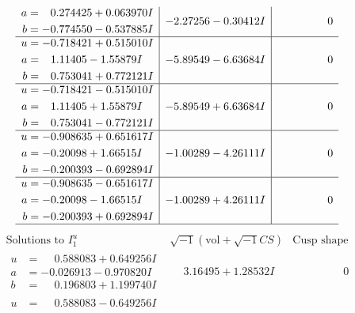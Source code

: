 \documentclass[1p]{elsarticle_modified}
\theoremstyle{definition}
\newcommand{\I}{\sqrt{-1}}
\begin{document}
$$\begin{array}{c|c|c}
\begin{aligned}
a &= \phantom{-}0.274425 + 0.063970 I \\
b &= -0.774550 - 0.537885 I\end{aligned}
 & -2.27256 - 0.30412 I & \phantom{-0.000000 } 0 \\ \hline\begin{aligned}
u &= -0.718421 + 0.515010 I \\
a &= \phantom{-}1.11405 - 1.55879 I \\
b &= \phantom{-}0.753041 + 0.772121 I\end{aligned}
 & -5.89549 - 6.63684 I & \phantom{-0.000000 } 0 \\ \hline\begin{aligned}
u &= -0.718421 - 0.515010 I \\
a &= \phantom{-}1.11405 + 1.55879 I \\
b &= \phantom{-}0.753041 - 0.772121 I\end{aligned}
 & -5.89549 + 6.63684 I & \phantom{-0.000000 } 0 \\ \hline\begin{aligned}
u &= -0.908635 + 0.651617 I \\
a &= -0.20098 + 1.66515 I \\
b &= -0.200393 - 0.692894 I\end{aligned}
 & -1.00289 - 4.26111 I & \phantom{-0.000000 } 0 \\ \hline\begin{aligned}
u &= -0.908635 - 0.651617 I \\
a &= -0.20098 - 1.66515 I \\
b &= -0.200393 + 0.692894 I\end{aligned}
 & -1.00289 + 4.26111 I & \phantom{-0.000000 } 0\\
 \hline 
 \end{array}$$\newpage$$\begin{array}{c|c|c}  
\text{Solutions to }I^u_{1}& \I (\text{vol} + \sqrt{-1}CS) & \text{Cusp shape}\\
 \hline 
\begin{aligned}
u &= \phantom{-}0.588083 + 0.649256 I \\
a &= -0.026913 - 0.970820 I \\
b &= \phantom{-}0.196803 + 1.199740 I\end{aligned}
 & \phantom{-}3.16495 + 1.28532 I & \phantom{-0.000000 } 0 \\ \hline\begin{aligned}
u &= \phantom{-}0.588083 - 0.649256 I \\

\end{aligned}
\end{array}$$
\end{document}
